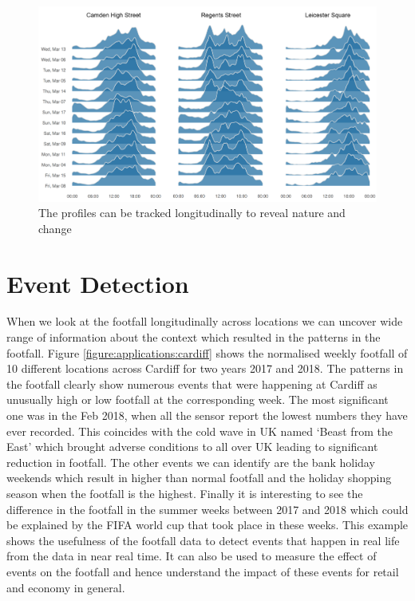 \begin{figure}
  \includegraphics[trim={0 10 0 0},clip]{images/applications-location-profiles.png}
  \caption{The profiles can be tracked longitudinally to reveal nature and change}
  \label{}
\end{figure}

\section{Event Detection}

When we look at the footfall longitudinally across locations we can uncover wide range of information about the context which resulted in the patterns in the footfall.
Figure \ref{figure:applications:cardiff} shows the normalised weekly footfall of 10 different locations across Cardiff for two years 2017 and 2018.
The patterns in the footfall clearly show numerous events that were happening at Cardiff as unusually high or low footfall at the corresponding week.
The most significant one was in the Feb 2018, when all the sensor report the lowest numbers they have ever recorded. 
This coincides with the cold wave in UK named `Beast from the East' which brought adverse conditions to all over UK leading to significant reduction in footfall.
The other events we can identify are the bank holiday weekends which result in higher than normal footfall and the holiday shopping season when the footfall is the highest.
Finally it is interesting to see the difference in the footfall in the summer weeks between 2017 and 2018 which could be explained by the FIFA world cup that took place in these weeks.
This example shows the usefulness of the footfall data to detect events that happen in real life from the data in near real time.
It can also be used to measure the effect of events on the footfall  and hence understand the impact of these events for retail and economy in general.


